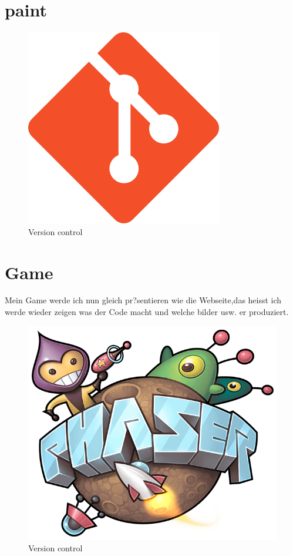 \documentclass{article}
\begin{document}
\cleardoublepage

\section{paint}


\begin{figure}[ht]
    \centering
    \includegraphics[width=.5\linewidth]{git_logo}
    \caption{Version control}
    \label{fig:sub1}
    \end{figure}
\cleardoublepage
























\section{Game}
Mein Game werde ich nun gleich pr?sentieren wie die Webseite,das heisst ich werde wieder zeigen was der Code macht und welche bilder usw. er produziert.
\begin{figure}[ht]
    \centering
    \includegraphics[width=.5\linewidth]{phaser}
    \caption{Version control}
    \label{fig:sub1}
    \end{figure}
\end{document}
